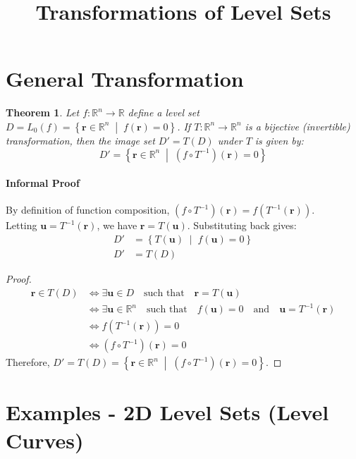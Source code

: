 \documentclass{article}
\title{Transformations of Level Sets}
\author{}
\date{}
\newtheorem{theorem}{Theorem}
\newcommand{\bb}[1]{\mathbb{#1}}
\renewcommand{\vec}[1]{\boldsymbol{#1}}
\begin{document}
\maketitle

\section{General Transformation}

\begin{theorem}
Let $f: \bb{R}^n \to \bb{R}$ define a level set $D = L_0(f) = \left\{ \vec{r} \in \bb{R}^n \;\middle|\; f(\vec{r}) = 0 \right\}$. 
If $T: \bb{R}^n \to \bb{R}^n$ is a bijective (invertible) transformation, 
then the image set $D' = T(D)$ under $T$ is given by:
\begin{equation}
  D' = \left\{ \vec{r} \in \bb{R}^n \;\middle|\; (f \circ T^{-1})(\vec{r}) = 0 \right\}
\end{equation}
\end{theorem}

\paragraph{Informal Proof}
By definition of function composition, $ (f \circ T^{-1})(\vec{r}) = f(T^{-1}(\vec{r})) $. \\
Letting $\vec{u} = T^{-1}(\vec{r})$, we have $\vec{r} = T(\vec{u})$. Substituting back gives:
\begin{align*}
  D' &= \left\{ T(\vec{u}) \;\middle|\; f(\vec{u}) = 0 \right\} \\
  D' &= T(D)
\end{align*}

\begin{proof}
\begin{align*}
  \vec{r} \in T(D) &\iff \exists \vec{u} \in D \quad \text{such that} \quad \vec{r} = T(\vec{u}) \\
  &\iff \exists \vec{u} \in \bb{R}^n \quad \text{such that} \quad f(\vec{u}) = 0 \quad \text{and} \quad \vec{u} = T^{-1}(\vec{r}) \\
  &\iff f(T^{-1}(\vec{r})) = 0 \\
  &\iff (f \circ T^{-1})(\vec{r}) = 0
\end{align*}
Therefore, $D' = T(D) = \left\{ \vec{r} \in \bb{R}^n \;\middle|\; (f \circ T^{-1})(\vec{r}) = 0 \right\}$.
\end{proof}

\section{Examples - 2D Level Sets (Level Curves)}
\end{document}
